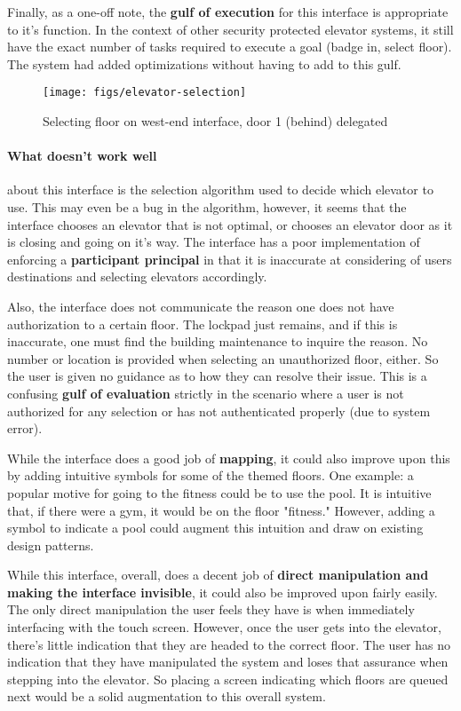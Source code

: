 Finally, as a one-off note, the \textbf{gulf of execution} for this interface is appropriate to it's function. In the context of other security protected elevator systems, it still have the exact number of tasks required to execute a goal (badge in, select floor). The system had added optimizations without having to add to this gulf.

\begin{figure}[H]
  \centering
  \texttt{[image: figs/elevator-selection]}
  \caption{Selecting floor on west-end interface, door 1 (behind) delegated}
  \label{fig::1}
\end{figure}


\paragraph{What doesn't work well} about this interface is the selection algorithm used to decide which elevator to use. This may even be a bug in the algorithm, however, it seems that the interface chooses an elevator that is not optimal, or chooses an elevator door as it is closing and going on it's way. The interface has a poor implementation of enforcing a \textbf{participant principal} in that it is inaccurate at considering of users destinations and selecting elevators accordingly.

Also, the interface does not communicate the reason one does not have authorization to a certain floor. The lockpad just remains, and if this is inaccurate, one must find the building maintenance to inquire the reason. No number or location is provided when selecting an unauthorized floor, either. So the user is given no guidance as to how they can resolve their issue. This is a confusing \textbf{gulf of evaluation} strictly in the scenario where a user is not authorized for any selection or has not authenticated properly (due to system error).

While the interface does a good job of \textbf{mapping}, it could also improve upon this by adding intuitive symbols for some of the themed floors. One example: a popular motive for going to the fitness could be to use the pool. It is intuitive that, if there were a gym, it would be on the floor "fitness." However, adding a symbol to indicate a pool could augment this intuition and draw on existing design patterns.

While this interface, overall, does a decent job of \textbf{direct manipulation and making the interface invisible}, it could also be improved upon fairly easily. The only direct manipulation the user feels they have is when immediately interfacing with the touch screen. However, once the user gets into the elevator, there's little indication that they are headed to the correct floor. The user has no indication that they have manipulated the system and loses that assurance when stepping into the elevator. So placing a screen indicating which floors are queued next would be a solid augmentation to this overall system.

